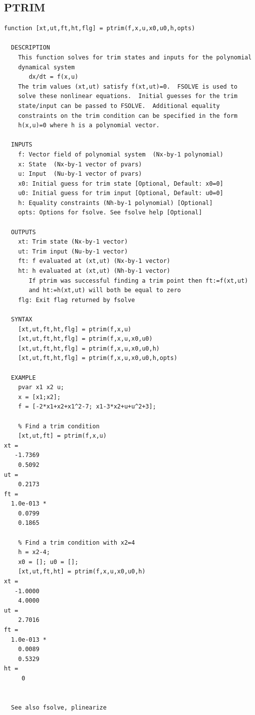 \documentclass{article}
\begin{document}
\subsection{PTRIM}
\begin{verbatim}
function [xt,ut,ft,ht,flg] = ptrim(f,x,u,x0,u0,h,opts)

  DESCRIPTION
    This function solves for trim states and inputs for the polynomial
    dynamical system
       dx/dt = f(x,u)
    The trim values (xt,ut) satisfy f(xt,ut)=0.  FSOLVE is used to
    solve these nonlinear equations.  Initial guesses for the trim
    state/input can be passed to FSOLVE.  Additional equality
    constraints on the trim condition can be specified in the form
    h(x,u)=0 where h is a polynomial vector.

  INPUTS
    f: Vector field of polynomial system  (Nx-by-1 polynomial)
    x: State  (Nx-by-1 vector of pvars)
    u: Input  (Nu-by-1 vector of pvars)
    x0: Initial guess for trim state [Optional, Default: x0=0]
    u0: Initial guess for trim input [Optional, Default: u0=0]
    h: Equality constraints (Nh-by-1 polynomial) [Optional]
    opts: Options for fsolve. See fsolve help [Optional]

  OUTPUTS
    xt: Trim state (Nx-by-1 vector)
    ut: Trim input (Nu-by-1 vector)
    ft: f evaluated at (xt,ut) (Nx-by-1 vector)
    ht: h evaluated at (xt,ut) (Nh-by-1 vector)
       If ptrim was successful finding a trim point then ft:=f(xt,ut)
       and ht:=h(xt,ut) will both be equal to zero
    flg: Exit flag returned by fsolve

  SYNTAX
    [xt,ut,ft,ht,flg] = ptrim(f,x,u)
    [xt,ut,ft,ht,flg] = ptrim(f,x,u,x0,u0)
    [xt,ut,ft,ht,flg] = ptrim(f,x,u,x0,u0,h)
    [xt,ut,ft,ht,flg] = ptrim(f,x,u,x0,u0,h,opts)

  EXAMPLE
    pvar x1 x2 u;
    x = [x1;x2];
    f = [-2*x1+x2+x1^2-7; x1-3*x2+u+u^2+3];

    % Find a trim condition
    [xt,ut,ft] = ptrim(f,x,u)
xt =
   -1.7369
    0.5092
ut =
    0.2173
ft =
  1.0e-013 *
    0.0799
    0.1865

    % Find a trim condition with x2=4
    h = x2-4;
    x0 = []; u0 = [];
    [xt,ut,ft,ht] = ptrim(f,x,u,x0,u0,h)
xt =
   -1.0000
    4.0000
ut =
    2.7016
ft =
  1.0e-013 *
    0.0089
    0.5329
ht =
     0


  See also fsolve, plinearize

\end{verbatim}
\newpage
\end{document}
